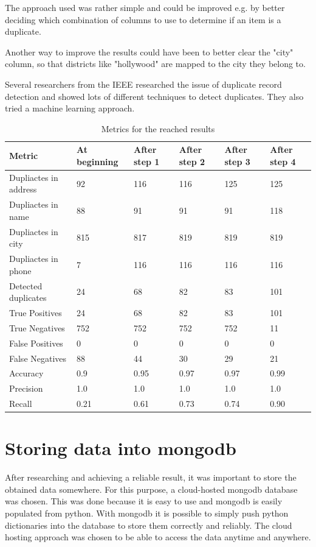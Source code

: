 \documentclass[conference]{IEEEtran}
\begin{document}
The approach used was rather simple and could be improved e.g. by better deciding which combination of columns to use to determine if an item is a duplicate. 

Another way to improve the results could have been to better clear the "city" column, so that districts like "hollywood" are mapped to the city they belong to. 

Several researchers from the IEEE researched the issue of duplicate record detection and showed lots of different techniques to detect duplicates. They also tried a machine learning approach\cite{bib:foreign_research}.   
\begin{table}[h]
	\begin{center}
		\caption{Metrics for the reached results}
		\label{tab:results} 
		\begin{tabular}{|p{1.5cm}||p{0.8cm}|p{0.8cm}|p{0.8cm}|p{0.8cm}|p{0.8cm}|}
			\hline
			Metric & At beginning & After step 1 & After step 2 & After step 3 & After step 4 \\ 
			\hline\hline
			Dupliactes in address &92&116&116&125&125\\
			\hline
			Dupliactes in name &88&91&91&91&118\\
			\hline
			Dupliactes in city &815&817&819&819&819\\
			\hline
			Dupliactes in phone &7 & 116&116&116&116\\
			\hline
			Detected duplicates &24&68&82&83&101\\
			\hline
			True Positives &24&68&82&83&101  \\ 
			\hline
			True Negatives &752&752&752&752&11  \\  
			\hline
			False Positives &0&0&0&0&0\\  
			\hline
			False Negatives &88 &44&30&29&21\\  
			\hline
			Accuracy &0.9&0.95&0.97&0.97&0.99\\  
			\hline
			Precision &1.0 & 1.0&1.0&1.0&1.0\\  
			\hline
			Recall &0.21&0.61&0.73&0.74&0.90\\
			\hline
		\end{tabular}
	\end{center}
\end{table}
\section{Storing data into mongodb}
After researching and achieving a reliable result, it was important to store the obtained  data somewhere. For this purpose, a cloud-hosted mongodb database was chosen. This was done because it is easy to use and mongodb is easily populated from python. With mongodb it is possible to simply push python dictionaries into the database to store them correctly and reliably. The cloud hosting approach was chosen to be able to access the data anytime and anywhere. 
\end{document}
